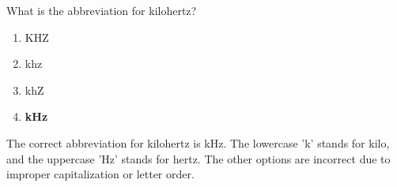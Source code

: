 \begin{tcolorbox}[colback=gray!10!white,colframe=black!75!black,title={T5C13}]
    What is the abbreviation for kilohertz?
    \begin{enumerate}[label=\Alph*),noitemsep]
        \item KHZ
        \item khz
        \item khZ
        \item \textbf{kHz}
    \end{enumerate}
\end{tcolorbox}
The correct abbreviation for kilohertz is kHz. The lowercase 'k' stands for kilo, and the uppercase 'Hz' stands for hertz. The other options are incorrect due to improper capitalization or letter order.

